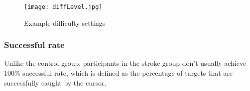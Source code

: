 \begin{figure}
	\texttt{[image: diffLevel.jpg]}
	\centering
	\caption{Example difficulty settings}
	\medskip
	\small 
	\label{fig:diffLevel}
\end{figure}

\subsubsection{Successful rate}

Unlike the control group, participants in the stroke group don't usually achieve 100\% successful rate, which is defined as the percentage of targets that are successfully caught by the cursor. 
